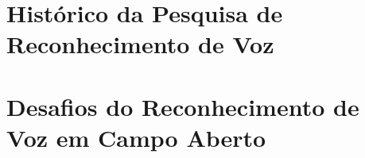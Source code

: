 \section{Histórico da Pesquisa de Reconhecimento de Voz}

\section{Desafios do Reconhecimento de Voz em Campo Aberto}